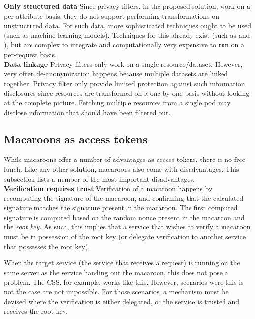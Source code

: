 \noindent \textbf{Only structured data} Since privacy filters, in the proposed solution, work on a per-attribute basis, they do not support performing transformations on unstructured data. For such data, more sophisticated techniques ought to be used (such as machine learning models). Techniques for this already exist (such as \citet{privacy-unstructured-scoring} and \citet{privacy-preserving-unstructured}), but are complex to integrate and computationally very expensive to run on a per-request basis. \\

\noindent \textbf{Data linkage} Privacy filters only work on a single resource/dataset. However, very often de-anonymization happens because multiple datasets are linked together. Privacy filter only provide limited protection against such information disclosures since resources are transformed on a one-by-one basis without looking at the complete picture. Fetching multiple resources from a single pod may disclose information that should have been filtered out.

\subsection{Macaroons as access tokens}
While macaroons offer a number of advantages as access tokens, there is no free lunch. Like any other solution, macaroons also come with disadvantages. This subsection lists a number of the most important disadvantages.\\

\noindent \textbf{Verification requires trust} Verification of a macaroon happens by recomputing the signature of the macaroon, and confirming that the calculated signature matches the signature present in the macaroon. The first computed signature is computed based on the random nonce present in the macaroon and the \textit{root key}. As such, this implies that a service that wishes to verify a macaroon must be in possession of the root key (or delegate verification to another service that possesses the root key). 

When the target service (the service that receives a request) is running on the same server as the service handing out the macaroon, this does not pose a problem. The \acrlong{CSS}, for example, works like this. However, scenarios were this is not the case are not impossible. For those scenarios, a mechanism must be devised where the verification is either delegated, or the service is trusted and receives the root key.\\

